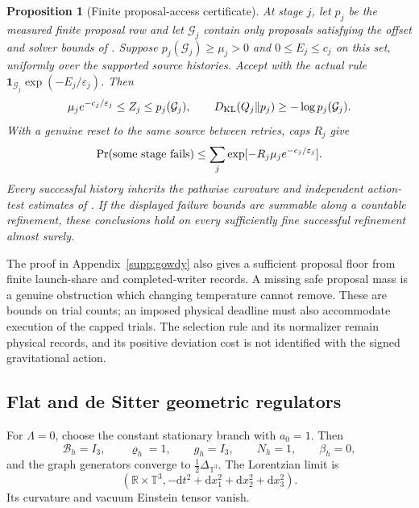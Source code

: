 \documentclass[11pt]{article}
\newtheorem{proposition}[proposition]{Proposition}
\theoremstyle{definition}
\theoremstyle{remark}
\newcommand{\R}{\mathbb R}
\newcommand{\one}{\mathbf 1}
\newcommand{\dd}{\mathrm d}
\begin{document}
\begin{proposition}[Finite proposal-access certificate]
\label{prop:main-safe-access}
At stage $j$, let $p_j$ be the measured finite proposal row and let
$\mathcal G_j$ contain only proposals satisfying the offset and solver bounds
of .  Suppose
$p_j(\mathcal G_j)\ge\mu_j>0$ and $0\le E_j\le c_j$ on this set,
uniformly over the supported source histories.  Accept with the actual rule
$\one_{\mathcal G_j}\exp(-E_j/\varepsilon_j)$.  Then
\begin{equation}
 \mu_j e^{-c_j/\varepsilon_j}\le Z_j\le p_j(\mathcal G_j),
 \qquad
 D_{\rm KL}(Q_j\Vert p_j)\ge-\log p_j(\mathcal G_j).
 \label{eq:main-safe-proposal-bounds}
\end{equation}
With a genuine reset to the same source between retries, caps $R_j$ give
\begin{equation}
 \Pr(\hbox{some stage fails})
       \le\sum_j\exp[-R_j\mu_j e^{-c_j/\varepsilon_j}].
 \label{eq:main-safe-retry-bound}
\end{equation}
Every successful history inherits the pathwise curvature and independent
action-test estimates of .  If the displayed
failure bounds are summable along a countable refinement, these conclusions
hold on every sufficiently fine successful refinement almost surely.
\end{proposition}

The proof in Appendix~\ref{supp:gowdy} also gives a sufficient proposal floor
from finite launch-share and completed-writer records.  A missing safe
proposal mass is a genuine obstruction which changing temperature cannot
remove.  These are bounds on trial counts; an imposed physical deadline must
also accommodate execution of the capped trials.  The selection rule and its
normalizer remain physical records, and its positive deviation cost is not
identified with the signed gravitational action.

\subsection{Flat and de Sitter geometric regulators}

For $\Lambda=0$, choose the constant stationary branch with $a_0=1$.
Then
\begin{equation}
 \mathcal B_h=I_3,
 \qquad \varrho_h=1,
 \qquad g_h=I_3,
 \qquad N_h=1,
 \qquad \beta_h=0,
 \label{eq:flat-adm-main}
\end{equation}
and the graph generators converge to $\tfrac12\Delta_{\mathbb T^3}$.  The
Lorentzian limit is
\begin{equation}
 \boxed{
 (\R\times\mathbb T^3,
 -\dd t^2+\dd x_1^2+\dd x_2^2+\dd x_3^2).}
 \label{eq:flat-metric-main}
\end{equation}
Its curvature and vacuum Einstein tensor vanish.
\end{document}
